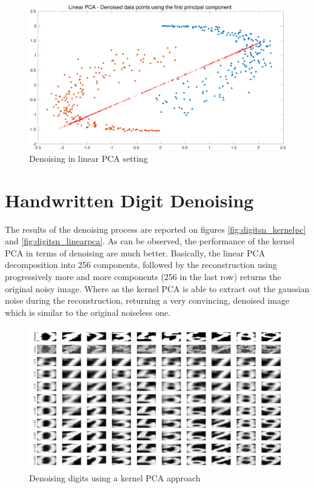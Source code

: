 \documentclass[11pt, a4paper]{article}
\begin{document}
\begin{figure}[H]
  \centering
  \includegraphics[scale=.30]{kpca_linear.pdf}
  \caption{Denoising in linear PCA setting}
  \label{fig:kpca_linear}
\end{figure}

\section{Handwritten Digit Denoising}

The results of the denoising process are reported on figures
\ref{fig:digitsn_kernelpc} and \ref{fig:digitsn_linearpca}. As can be
observed, the performance of the kernel PCA in terms of denoising are
much better. Basically, the linear PCA decomposition into 256
components, followed by the reconstruction using progressively more
and more components (256 in the last row) returns the original noisy
image. Where as the kernel PCA is able to extract out the gaussian
noise during the reconstruction, returning a very convincing, denoised
image which is similar to the original noiseless one.


\begin{figure}[H]
  \centering
  \includegraphics[scale=.30]{digitsn_kernelpca.jpg}
  \caption{Denoising digits using a kernel PCA approach}
  \label{fig:digitsn_kernelpca}
\end{figure}
\end{document}
